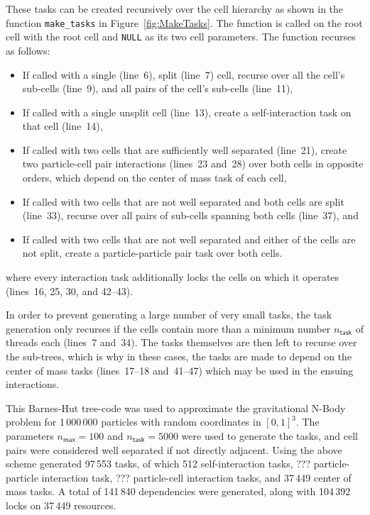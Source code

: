 \documentclass[preprint]{elsarticle}
\newcommand{\fig}[1]
    {Figure~\ref{fig:#1}}
\begin{document}
These tasks can be created recursively over the cell hierarchy
as shown in the function {\tt make\_tasks} in \fig{MakeTasks}.
The function is called on the root cell with the root cell
and {\tt NULL} as its two cell parameters.
The function recurses as follows:
\begin{itemize}
    \item If called with a single (line~6), split (line~7) cell,
        recurse over all the cell's sub-cells (line~9), and all
        pairs of the cell's sub-cells (line~11),
    \item If called with a single unsplit cell (line~13),
        create a self-interaction task on that cell (line~14),
    \item If called with two cells that are sufficiently well
        separated (line~21), create two particle-cell pair
        interactions (lines~23 and~28) over both cells in
        opposite orders, which depend on the center of mass
        task of each cell,
    \item If called with two cells that are not well
        separated and both cells are split (line~33),
        recurse over all pairs of sub-cells spanning
        both cells (line~37), and
    \item If called with two cells that are not well separated
        and either of the cells are not split, create
        a particle-particle pair task over both cells.
\end{itemize}
\noindent where every interaction task additionally locks
the cells on which it operates (lines~16, 25, 30, and 42--43).

In order to prevent generating
a large number of very small tasks, the task generation only recurses
if the cells contain more than a minimum number $n_\mathsf{task}$
of threads each (lines~7 and~34).
The tasks themselves are then left to recurse over the sub-trees,
which is why in these cases, the tasks are made to depend on the
center of mass tasks (lines~17--18 and~41--47)
which may be used in the ensuing interactions.

This Barnes-Hut tree-code was used to approximate the gravitational
N-Body problem for 1\,000\,000 particles with random coordinates
in $[0,1]^3$.
The parameters $n_\mathsf{max}=100$ and $n_\mathsf{task}=5000$
were used to generate the tasks, and cell pairs were considered
well separated if not directly adjacent.
Using the above scheme generated 97\,553 tasks, of which
512 self-interaction tasks, ??? particle-particle interaction
task, ??? particle-cell interaction tasks, and 37\,449
center of mass tasks.
A total of 141\,840 dependencies were generated, along with
104\,392 locks on 37\,449 resources.
\end{document}
